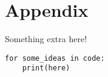 \section{Appendix}

Something extra here!

\begin{questionbox}
\begin{verbatim}
for some_ideas in code:
    print(here)
\end{verbatim}
\end{questionbox}


